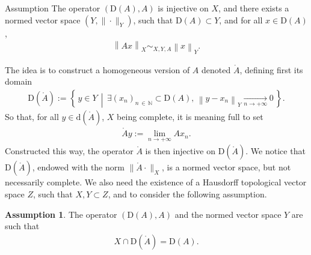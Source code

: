 \documentclass[10pt]{amsart}
\theoremstyle{definition}\newtheorem{defi}[theo]{Definition}\newtheorem{rema}[theo]{Remark}\newtheorem{exam}[theo]{Example}\newtheorem{exem}[theo]{Example}\newtheorem{nota}[theo]{Notation}
\newcommand{\bbN}{\mathbb{N}}
\newcommand{\rmd}{\mathrm{d}}
\newcommand{\rmD}{\mathrm{D}}
\newcommand{\rgA}{\mathring{A}}
\newtheorem{assu}[theo]{Assumption} }
\let\oldexists\exists
\renewcommand*{\exists}{\mathrel{\oldexists}}
\begin{document}
\begin{enonce}
{Assumption}\label{asmpt:homogeneousdomaindef}
The operator $(\rmD(A),A)$ is injective on $X$, and there exists a normed vector space $(Y, \| \cdot\|_{Y})$, such that $\rmD(A)\subset Y$, and for all $x\in \rmD(A)$,
\begin{align}
\left\| Ax\right\|_{X} \sim_{X,Y,A} \left\| x \right\|_{Y} .
\end{align}
\end{enonce}

The idea is to construct a homogeneous version of $A$ denoted $\rgA$, defining first its domain
\begin{align*}
\rmD(\rgA):= \left\{\, y\in Y\, \middle|\, \exists (x_n)_{n\,\in\,\bbN}\subset \rmD(A),\, \left\| y-x_n\right\|_Y\underset{n\rightarrow +\infty}{\longrightarrow} 0 \,\right\}.
\end{align*}
So that, for all $y\in \rmd(\rgA)$, $X$ being complete, it is meaning full to set
\begin{align*}
\rgA y:= \lim_{n\rightarrow +\infty} Ax_n .
\end{align*}
Constructed this way, the operator $\rgA$ is then injective on $\rmD(\rgA)$. We notice that $\rmD(\rgA)$, endowed with the norm 
$\|\rgA\cdot\|_{X}$, is a normed vector space, but not necessarily complete. We also need the existence of a Hausdorff topological vector space $Z$, such that $X,Y\subset Z$, and to consider the following assumption.

\begin{assu}\label{asmpt:homogeneousdomainintersect}
The operator $(\rmD(A),A)$ and the normed vector space $Y$ are such that
\begin{align}
X\cap\rmD(\rgA) = \rmD({A}) .
\end{align}
\end{assu}
\end{document}
